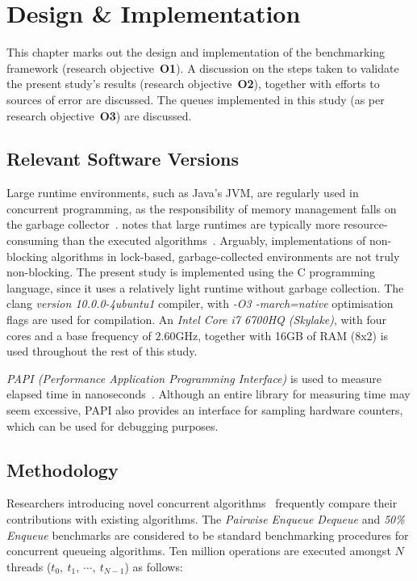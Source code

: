 \chapter{Design \& Implementation\label{chap:design_and_implementation}}
This chapter marks out the design and implementation of the benchmarking
framework (research objective~\textbf{O1}). A discussion on the steps taken to validate the
present study's results (research objective~\textbf{O2}), together
with efforts to sources of error are discussed. The queues implemented in this
study (as per research objective~\textbf{O3}) are discussed.

\section{Relevant Software Versions}
Large runtime environments, such as Java's JVM, are regularly used in
concurrent programming, as the responsibility of memory management falls on the
garbage collector~\citep{kogan2011wait}. \citeauthor{fog2020optimizing} notes
that large runtimes are typically more resource-consuming than the executed
algorithms~\citep{fog2020optimizing}. Arguably, implementations of non-blocking
algorithms in lock-based, garbage-collected environments are not truly
non-blocking. The present study is implemented using the C programming language, since
it uses a relatively light runtime without garbage collection. The clang
\emph{version 10.0.0-4ubuntu1} compiler, with \emph{-O3 -march=native}
optimisation flags are used for compilation. An \emph{Intel Core i7 6700HQ
(Skylake)}, with four cores and a base frequency of $2.60\text{GHz}$, together
with 16GB of RAM (8x2) is used throughout the rest of this study.

\emph{PAPI (Performance Application Programming Interface)} is used to measure
elapsed time in nanoseconds~\citep{terpstra2010papi}. Although an entire library for measuring time 
may seem excessive, PAPI also provides an interface for
sampling hardware counters, which can be used for debugging purposes.

\section{Methodology\label{sec:design_and_implementation_methodology}}

Researchers introducing novel concurrent
algorithms~\citep{michael1996simple,valois1994queues,kogan2011wait,hoffman2007baskets,yang2016wait}
frequently compare their contributions with existing algorithms. The
\emph{Pairwise Enqueue Dequeue} and \emph{50\% Enqueue}
benchmarks are considered to be standard benchmarking procedures for concurrent
queueing algorithms. Ten million operations are
executed amongst $N$ threads ($t_0,~t_1,~\cdots,~t_{N-1}$) as follows: 

